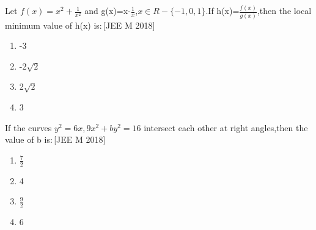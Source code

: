 \item[38.] Let $f(x)=x^{2}+\frac{1}{x^2}$ and g(x)=x-$\frac{1}{x}$,$x \in R-{\{-1,0,1}\}$.If h(x)=$\frac{f(x)}{g(x)}$,then the local minimum value of h(x) is$:$\hfill[JEE M 2018]\\
\begin{enumerate}
    \item  -3\\
    \item  -2$\sqrt{2}$\\
    \item   2$\sqrt{2}$\\
    \item   3\\
\end{enumerate}
\item[39.] If the curves $y^2=6x,9x^2+by^2=16$ intersect each other at right angles,then the value of b is$:$\hfill[JEE M 2018]\\
\begin{enumerate}
    \item  $\frac{7}{2}$\\
    \item  4\\
    \item  $\frac{9}{2}$\\
    \item  6\\
\end{enumerate}

